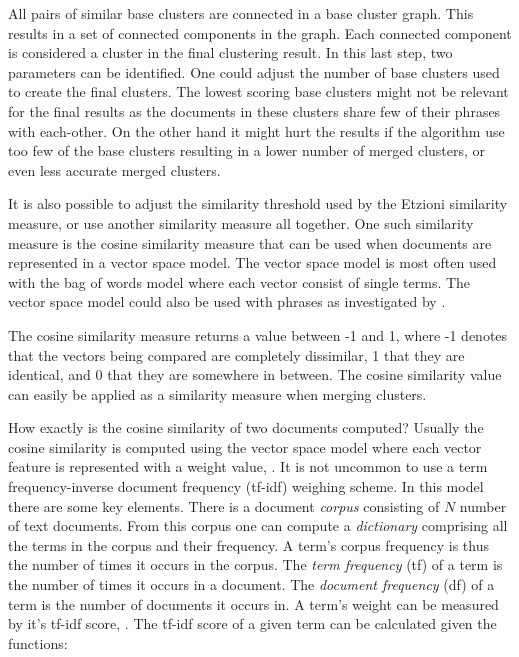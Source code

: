 All pairs of similar base clusters are connected in a base cluster graph. This results in a set of connected components in the graph. Each connected component is considered a cluster in the final clustering result. In this last step, two parameters can be identified. One could adjust the number of base clusters used to create the final clusters. The lowest scoring base clusters might not be relevant for the final results as the documents in these clusters share few of their phrases with each-other. On the other hand it might hurt the results if the algorithm use too few of the base clusters resulting in a lower number of merged clusters, or even less accurate merged clusters.

It is also possible to adjust the similarity threshold used by the Etzioni similarity measure, or use another similarity measure all together. One such similarity measure is the cosine similarity measure that can be used when documents are represented in a vector space model. The vector space model is most often used with the bag of words model where each vector consist of single terms. The vector space model could also be used with phrases as investigated by \cite{Chim2007}.

The cosine similarity measure returns a value between -1 and 1, where -1 denotes that the vectors being compared are completely dissimilar, 1 that they are identical, and 0 that they are somewhere in between. The cosine similarity value can easily be applied as a similarity measure when merging clusters.

How exactly is the cosine similarity of two documents computed? Usually the cosine similarity is computed using the vector space model where each vector feature is represented with a weight value, \parencite{Manning2009a}. It is not uncommon to use a term frequency-inverse document frequency (tf-idf) weighing scheme. In this model there are some key elements. There is a document \textit{corpus} consisting of \(N\) number of text documents. From this corpus one can compute a \textit{dictionary} comprising all the terms in the corpus and their frequency. A term's corpus frequency is thus the number of times it occurs in the corpus. The \textit{term frequency} (tf) of a term is the number of times it occurs in a document. The \textit{document frequency} (df) of a term is the number of documents it occurs in. A term's weight can be measured by it's tf-idf score, \parencite{Manning2009a}. The tf-idf score of a given term can be calculated given the functions:



